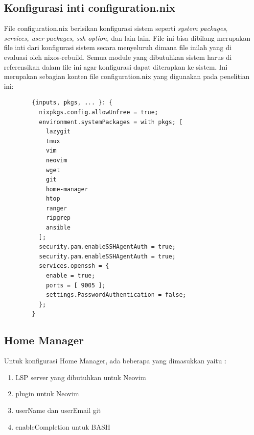 \documentclass[10pt,]{report}
\newenvironment{code}{\captionsetup{type=listing}}{\vspace{3mm}}
\begin{document}
\begin{adjustwidth}{20pt}{}
	\subsection{Konfigurasi inti configuration.nix}
	\vspace{-3mm}
	\begin{adjustwidth}{20pt}{}
		File configuration.nix berisikan konfigurasi sistem seperti \textit{system
			packages, services, user packages, ssh option, }dan lain-lain. File ini
		bisa dibilang merupakan file inti dari konfigurasi sistem secara menyeluruh
		dimana file inilah yang di evaluasi oleh nixos-rebuild. Semua module yang
		dibutuhkan sistem harus di referensikan dalam file ini agar konfigurasi
		dapat diterapkan ke sistem.
		Ini merupakan sebagian konten file configuration.nix yang digunakan pada
		penelitian ini:

		\begin{code}
			\begin{verbatim}
        {inputs, pkgs, ... }: {
          nixpkgs.config.allowUnfree = true;
          environment.systemPackages = with pkgs; [
            lazygit
            tmux
            vim
            neovim
            wget
            git
            home-manager
            htop
            ranger
            ripgrep
            ansible
          ];
          security.pam.enableSSHAgentAuth = true;
          security.pam.enableSSHAgentAuth = true;
          services.openssh = {
            enable = true;
            ports = [ 9005 ];
            settings.PasswordAuthentication = false;
          };
        }
      \end{verbatim}
		\end{code}
	\end{adjustwidth}
	\subsection{Home Manager}
	\vspace{-3mm}
	\begin{adjustwidth}{20pt}{}
		Untuk konfigurasi Home Manager, ada beberapa yang dimasukkan yaitu :
		\begin{enumerate}
			\item LSP server yang dibutuhkan untuk Neovim
			\item plugin untuk Neovim
			\item userName dan userEmail git
			\item enableCompletion untuk BASH
		\end{enumerate}


\end{adjustwidth}
\end{adjustwidth}
\end{document}
